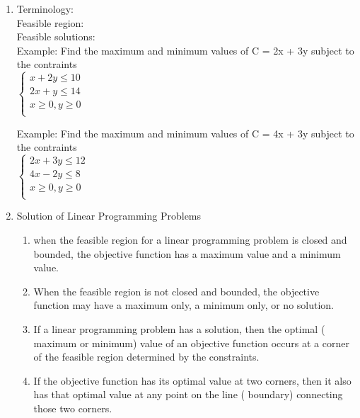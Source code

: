 \documentclass[12pt]{amsart}
\begin{document}
\begin{enumerate}

\item Terminology: \\

Feasible region: \\

Feasible solutions:\\

Example: Find the maximum and minimum values of C = 2x + 3y subject to the contraints\\

$\begin{cases}
	x + 2y \leq 10\\
	2x + y \leq 14 \\
	x \geq 0, y \geq 0 \\
	\end{cases}$ 
\vspace{4in}

Example: Find the maximum and minimum values of C = 4x + 3y subject to the contraints\\

$\begin{cases}
	2x + 3y \leq 12\\
	4x - 2y \leq 8 \\
	x \geq 0, y \geq 0 \\
	\end{cases}$ 
\vspace{4in}

\item Solution of Linear Programming Problems

	\begin{enumerate}
		\item when the feasible region for a linear programming problem is closed and bounded, the objective function has a maximum value and a minimum value. 
		\item When the feasible region is not closed and bounded, the objective function may have a maximum only, a minimum only, or no solution.
		\item If a linear programming problem has a solution, then the optimal ( maximum or minimum) value of an objective function occurs at a corner of the feasible region determined by the constraints.
		\item If the objective function has its optimal value at two corners, then it also has that optimal value at any point on the line ( boundary) connecting those two corners. 
	\end{enumerate}


\end{enumerate}
\end{document}
